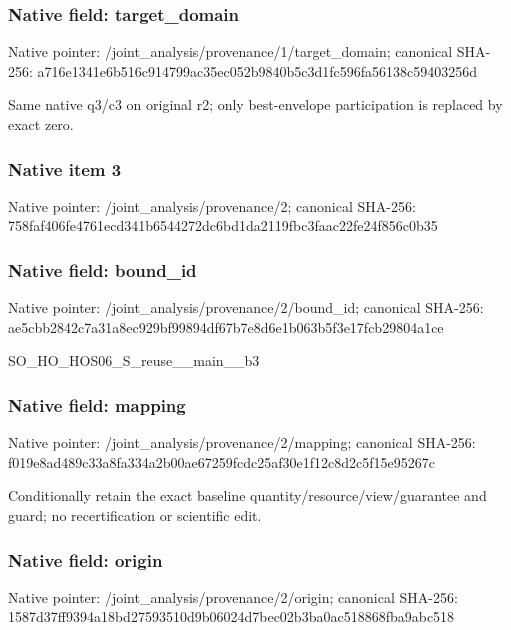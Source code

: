 \documentclass[10pt,a4paper]{article}
\begin{document}
\subsubsection{Native field: target\_\allowbreak{}domain}
Native pointer: /joint\_\allowbreak{}analysis/provenance/1/target\_\allowbreak{}domain; canonical SHA-256: a716e1341e6b516c914799ac35ec052b9840b5c3d1fc596fa56138c59403256d

\begingroup\raggedright\sloppy Same native q3/\allowbreak{}c3 on original r2;\allowbreak{} only best-envelope participation is replaced by exact zero.\par\endgroup

\subsubsection{Native item 3}
Native pointer: /joint\_\allowbreak{}analysis/provenance/2; canonical SHA-256: 758faf406fe4761ecd341b6544272dc6bd1da2119fbc3faac22fe24f856c0b35

\subsubsection{Native field: bound\_\allowbreak{}id}
Native pointer: /joint\_\allowbreak{}analysis/provenance/2/bound\_\allowbreak{}id; canonical SHA-256: ae5cbb2842c7a31a8ec929bf99894df67b7e8d6e1b063b5f3e17fcb29804a1ce

\begingroup\raggedright\sloppy SO\_\allowbreak{}HO\_\allowbreak{}HOS06\_\allowbreak{}S\_\allowbreak{}reuse\_\allowbreak{}\_\allowbreak{}main\_\allowbreak{}\_\allowbreak{}b3\par\endgroup

\subsubsection{Native field: mapping}
Native pointer: /joint\_\allowbreak{}analysis/provenance/2/mapping; canonical SHA-256: f019e8ad489c33a8fa334a2b00ae67259fcdc25af30e1f12c8d2c5f15e95267c

\begingroup\raggedright\sloppy Conditionally retain the exact baseline quantity/\allowbreak{}resource/\allowbreak{}view/\allowbreak{}guarantee and guard;\allowbreak{} no recertification or scientific edit.\par\endgroup

\subsubsection{Native field: origin}
Native pointer: /joint\_\allowbreak{}analysis/provenance/2/origin; canonical SHA-256: 1587d37ff9394a18bd27593510d9b06024d7bec02b3ba0ac518868fba9abc518
\end{document}
